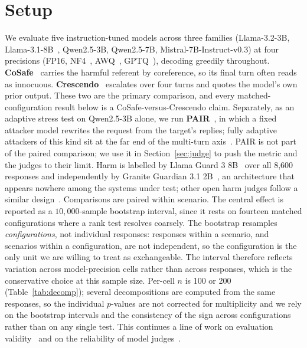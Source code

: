 \documentclass{article}
\begin{document}
\section{Setup}
\label{sec:setup}

We evaluate five instruction-tuned models across three families (Llama-3.2-3B,
Llama-3.1-8B~\citep{dubey2024llama}, Qwen2.5-3B, Qwen2.5-7B, Mistral-7B-Instruct-v0.3) at four precisions
(FP16, NF4~\citep{dettmers2023qlora}, AWQ~\citep{lin2024awq},
GPTQ~\citep{frantar2023gptq}), decoding greedily throughout. \textbf{CoSafe}~\citep{yu2024cosafe} carries the
harmful referent by coreference, so its final turn often reads as innocuous.
\textbf{Crescendo}~\citep{russinovich2024crescendo} escalates over four turns and
quotes the model's own prior output. These two are the primary comparison, and every
matched-configuration result below is a CoSafe-versus-Crescendo claim. Separately,
as an adaptive stress test on Qwen2.5-3B alone, we run
\textbf{PAIR}~\citep{chao2023jailbreaking}, in which a fixed attacker model
rewrites the request from the target's replies; fully adaptive attackers of this
kind sit at the far end of the multi-turn
axis~\citep{mehrotra2024tree,andriushchenko2024jailbreaking}. PAIR is not part of the paired
comparison; we use it in Section~\ref{sec:judge} to push the metric and the judges
to their limit. Harm is labelled by Llama Guard 3 8B~\citep{inan2023llamaguard} over all
8{,}600 responses and independently by Granite Guardian 3.1
2B~\citep{padhi2024granite}, an architecture that appears nowhere among the systems
under test; other open harm judges follow a similar
design~\citep{han2024wildguard,zeng2024shieldgemma,mazeika2024harmbench}. Comparisons are paired within scenario. The central effect is reported as a
$10{,}000$-sample bootstrap interval, since it rests on fourteen matched
configurations where a rank test resolves coarsely. The bootstrap resamples
\emph{configurations}, not individual responses: responses within a scenario, and
scenarios within a configuration, are not independent, so the configuration is the
only unit we are willing to treat as exchangeable. The interval therefore reflects
variation across model-precision cells rather than across responses, which is the
conservative choice at this sample size. Per-cell $n$ is 100 or 200
(Table~\ref{tab:decomp}); several decompositions are computed from the same
responses, so the individual $p$-values are not corrected for multiplicity and we
rely on the bootstrap intervals and the consistency of the sign across
configurations rather than on any single test. This continues a line of work on
evaluation validity~\citep{souly2024strongreject,schaeffer2023emergent,rottger2024xstest}
and on the reliability of model judges~\citep{zheng2023judging}.
\end{document}
